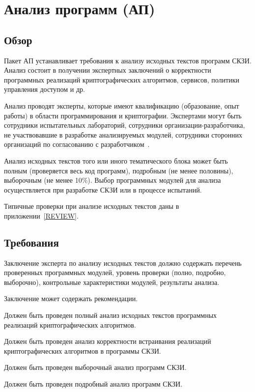 \section{Анализ программ (АП)}\label{CR}

\subsection{Обзор}\label{CR.Intro}

Пакет АП устанавливает требования к анализу исходных текстов программ СКЗИ.
%
Анализ состоит в получении экспертных заключений о корректности 
программных реализаций криптографических алгоритмов,
сервисов, политики управления доступом и др.

Анализ проводят эксперты, которые имеют квалификацию 
(образование, опыт работы) в области программирования и криптографии. 
%
Экспертами могут быть сотрудники испытательных лабораторий, 
сотрудники организации-разработчика, не участвовавшие в разработке 
анализируемых модулей, сотрудники сторонних организаций по согласованию
с разработчиком~.

Анализ исходных текстов того или иного тематического блока
может быть полным (проверяется весь код программ),
подробным (не менее половины), выборочным (не менее 10\%). 
%
Выбор программных модулей для анализа осуществляется при разработке СКЗИ или в
процессе испытаний.

Типичные проверки при анализе исходных текстов даны в приложении~\ref{REVIEW}.

\subsection{Требования}\label{CR.Reqs}

\label{R.CR.Experts}
Заключение эксперта по анализу исходных текстов
должно содержать перечень проверенных программных модулей, 
уровень проверки (полно, подробно, выборочно), 
контрольные характеристики модулей, результаты анализа.

\begin{note*}
Заключение может содержать рекомендации.
\end{note*}

\label{R.CR.Core}
Должен быть проведен полный анализ исходных текстов 
программных реализаций криптографических алгоритмов.

\label{R.CR.Embed}
Должен быть проведен анализ корректности встраивания реализаций 
криптографических алгоритмов в программы СКЗИ.

\label{R.CR.Selected}
Должен быть проведен выборочный анализ программ СКЗИ.

\label{R.CR.Detailed}
Должен быть проведен подробный анализ программ СКЗИ.

